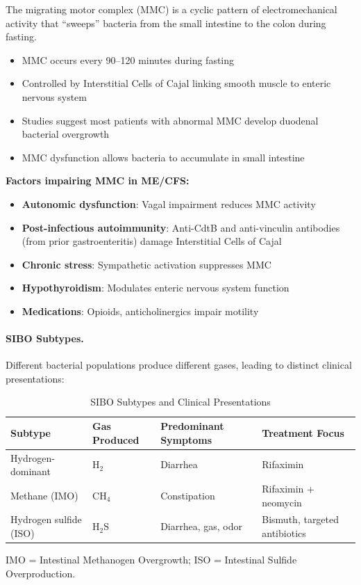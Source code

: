The migrating motor complex (MMC) is a cyclic pattern of electromechanical activity that ``sweeps'' bacteria from the small intestine to the colon during fasting.

\begin{itemize}
    \item MMC occurs every 90--120 minutes during fasting
    \item Controlled by Interstitial Cells of Cajal linking smooth muscle to enteric nervous system
    \item Studies suggest most patients with abnormal MMC develop duodenal bacterial overgrowth
    \item MMC dysfunction allows bacteria to accumulate in small intestine
\end{itemize}

\textbf{Factors impairing MMC in ME/CFS:}
\begin{itemize}
    \item \textbf{Autonomic dysfunction}: Vagal impairment reduces MMC activity
    \item \textbf{Post-infectious autoimmunity}: Anti-CdtB and anti-vinculin antibodies (from prior gastroenteritis) damage Interstitial Cells of Cajal
    \item \textbf{Chronic stress}: Sympathetic activation suppresses MMC
    \item \textbf{Hypothyroidism}: Modulates enteric nervous system function
    \item \textbf{Medications}: Opioids, anticholinergics impair motility
\end{itemize}

\paragraph{SIBO Subtypes.}

Different bacterial populations produce different gases, leading to distinct clinical presentations:

\begin{table}[htbp]
\centering
\caption{SIBO Subtypes and Clinical Presentations}
\label{tab:sibo-subtypes}
\begin{tabular}{@{}llll@{}}
\toprule
\textbf{Subtype} & \textbf{Gas Produced} & \textbf{Predominant Symptoms} & \textbf{Treatment Focus} \\
\midrule
Hydrogen-dominant & H$_2$ & Diarrhea & Rifaximin \\
Methane (IMO) & CH$_4$ & Constipation & Rifaximin + neomycin \\
Hydrogen sulfide (ISO) & H$_2$S & Diarrhea, gas, odor & Bismuth, targeted antibiotics \\
\bottomrule
\end{tabular}
\par\smallskip
\footnotesize{IMO = Intestinal Methanogen Overgrowth; ISO = Intestinal Sulfide Overproduction.}
\end{table}

